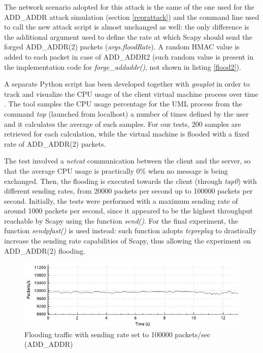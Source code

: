 The network scenario adopted for this attack is the same of the one used for the ADD\_ADDR attack simulation (section \ref{reprattack}) and the command line used to call the new attack script is almost unchanged as well: the only difference is the additional argument used to define the rate at which Scapy should send the forged ADD\_ADDR(2) packets (\textit{args.floodRate}). A random HMAC value is added to each packet in case of ADD\_ADDR2 (such random value is present in the implementation code for \textit{forge\_addaddr()}, not shown in listing \ref{flood2}).

A separate Python script has been developed together with \textit{gnuplot} in order to track and visualize the CPU usage of the client virtual machine process over time \cite{monitor}. The tool samples the CPU usage percentage for the UML process from the command \textit{top} (launched from localhost) a number of times defined by the user and it calculates the average of such samples. For our tests, 200 samples are retrieved for each calculation, while the virtual machine is flooded with a fixed rate of ADD\_ADDR(2) packets.

The test involved a \textit{netcat} communication between the client and the server, so that the average CPU usage is practically 0\% when no message is being exchanged. Then, the flooding is executed towards the client (through \textit{tap0}) with different sending rates, from 20000 packets per second up to 100000 packets per second. Initially, the tests were performed with a maximum sending rate of around 1000 packets per second, since it appeared to be the highest throughput reachable by Scapy using the function \textit{send()}. For the final experiment, the function \textit{sendpfast()} is used instead: such function adopts \textit{tcpreplay} to drastically increase the sending rate capabilities of Scapy, thus allowing the experiment on ADD\_ADDR(2) flooding. 

\begin{figure}[!htb]
\centering
\includegraphics[width=\textwidth]{images/wirethrough}
\caption{Flooding traffic with sending rate set to 100000 packets/sec (ADD\_ADDR)}
\label{fig:sendgraph}
\end{figure} 

